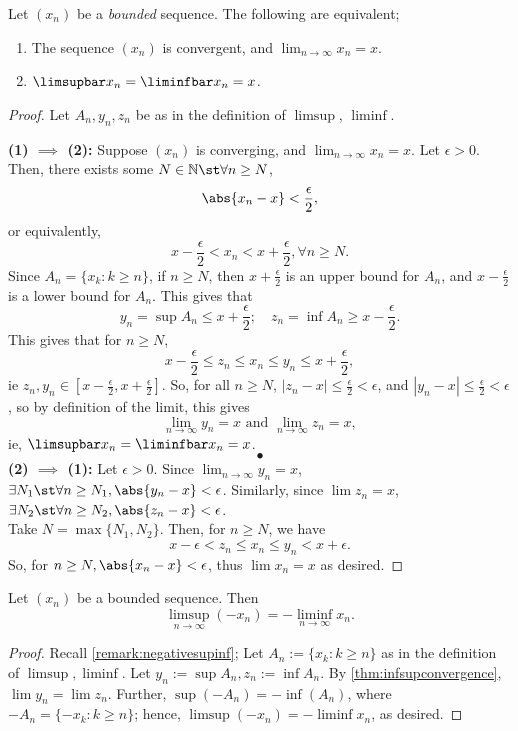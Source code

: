 \documentclass[12pt]{article}
\begin{document}
\begin{theorem}\label{thm:infsupconvergence}
  Let $(x_n)$ be a \emph{bounded} sequence. The following are equivalent;
  \begin{enumerate}
    \item The sequence $(x_n)$ is convergent, and \(\lim_{n\to\infty}x_n = x.\)
    \item $\limsupbar x_n = \liminfbar x_n = x$.
  \end{enumerate}
\end{theorem}

\begin{proof}
  Let $A_n, y_n, z_n$ be as in the definition of $\limsup$, $\liminf$.


  \textbf{(1) $\implies$ (2):} Suppose $(x_n)$ is converging, and $\lim_{n\to\infty}x_n = x$. Let $\epsilon > 0$. Then, there exists some $N \in \mathbb{N} \st \forall n \geq N$,  $$\abs{x_n - x} < \frac{\epsilon}{2},$$ or equivalently, $$x - \frac{\epsilon}{2} < x_n < x + \frac{\epsilon}{2}, \forall n \geq N.$$ Since $A_n = \{x_k : k \geq n\}$, if $n \geq N$, then $x + \frac{\epsilon}{2}$ is an upper bound for $A_n$, and $x - \frac{\epsilon}{2}$ is a lower bound for $A_n$. This gives that \[y_n = \sup A_n \leq x + \frac{\epsilon}{2}; \quad z_n = \inf A_n \geq x - \frac{\epsilon}{2}.\] This gives that for $n \geq N$, $$x - \frac{\epsilon}{2} \leq z_n \leq x_n \leq y_n \leq x + \frac{\epsilon}{2},$$ ie $z_n, y_n \in [x - \frac{\epsilon}{2}, x + \frac{\epsilon}{2}]$. So, for all $n \geq N$, $|z_n - x| \leq \frac{\epsilon}{2} < \epsilon$, and $|y_n - x| \leq \frac{\epsilon}{2} < \epsilon$, so by definition of the limit, this gives \[\lim_{n \to \infty} y_n = x \text{ and } \lim_{n\to\infty} z_n = x,\] ie, $\limsupbar x_n = \liminfbar x_n = x$.
  $$\bullet$$
  \textbf{(2) $\implies$ (1):} Let $\epsilon > 0$. Since $\lim_{n\to\infty} y_n = x$, $\exists N_1 \st \forall n \geq N_1, \abs{y_n - x }< \epsilon$. Similarly, since $\lim z_n = x$, $\exists N_2 \st \forall n \geq N_2, \abs{z_n - x} < \epsilon$.\\
  Take $N = \max \{N_1, N_2\}$. Then, for $n \geq N$, we have \[x - \epsilon < z_n \leq x_n \leq y_n < x + \epsilon.\] So, for $n \geq N, \abs{x_n - x} < \epsilon$, thus $\lim x_n = x$ as desired.
\end{proof}

\begin{example}
  Let $(x_n)$ be a bounded sequence. Then \[\limsup_{n\to\infty} (-x_n) = - \liminf_{n \to \infty} x_n.\]

\begin{proof}
  Recall \cref{remark:negativesupinf}; Let $A_n := \{x_k : k \geq n\}$ as in the definition of $\limsup, \liminf$. Let $y_n:=\sup A_n, z_n := \inf A_n$. By \cref{thm:infsupconvergence}, $\lim y_n = \lim z_n$. Further, $\sup (- A_n) = - \inf (A_n)$, where $-A_n = \{-x_k : k \geq n\}$; hence, $\limsup (-x_n) = -\liminf x_n$, as desired.
\end{proof}

\end{example}
\end{document}
